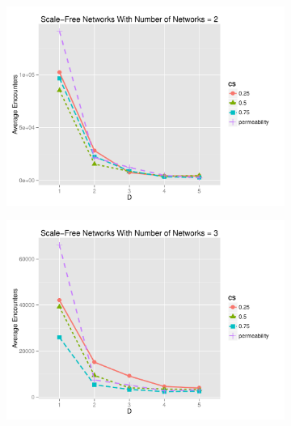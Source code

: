 \documentclass[preprint,number]{elsarticle}
\begin{document}
\begin{figure}[H]
	\centering
	\begin{subfigure}{.49\linewidth}
		\centering
		\includegraphics[width=1\linewidth]{"../analysis/pdf/context_switching_encounters_comp_sf_groupedbynets_2"}
		\caption{}
		\label{fig:ctx_switching_comp_sf_2}
	\end{subfigure}%
	\begin{subfigure}{.5\linewidth}
		\centering
		\includegraphics[width=1\linewidth]{"../analysis/pdf/context_switching_encounters_comp_sf_groupedbynets_3"}
		\caption{}
		\label{fig:ctx_switching_comp_sf_3}
	\end{subfigure}\\
	\begin{subfigure}{.49\linewidth}
		\centering

\end{subfigure}
\end{figure}
\end{document}
